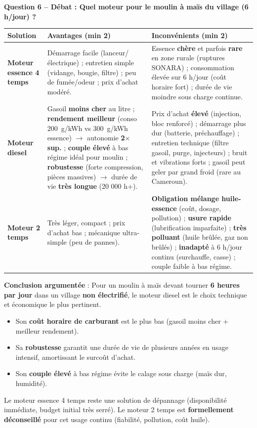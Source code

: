 \documentclass[11pt]{article}
\newcommand{\cle}[1]{{\popxbold\color{popdark}#1}}
\begin{document}
\begin{exoresolu}
\textbf{Question 6 -- Débat : Quel moteur pour le moulin à maïs du village (6 h/jour) ?}
\begin{center}
\begin{tabularx}{\linewidth}{|l|X|X|}
\hline
\rowcolor{popblueL} \textbf{Solution} & \textbf{Avantages (min 2)} & \textbf{Inconvénients (min 2)} \\
\hline
\textbf{Moteur essence 4 temps} & Démarrage facile (lanceur/électrique) ; entretien simple (vidange, bougie, filtre) ; peu de fumée/odeur ; prix d'achat modéré. & Essence \textbf{chère} et parfois \textbf{rare} en zone rurale (ruptures SONARA) ; consommation élevée sur 6 h/jour (coût horaire fort) ; durée de vie moindre sous charge continue.
\\ \hline
\textbf{Moteur diesel} & Gasoil \textbf{moins cher} au litre ; \textbf{rendement meilleur} (conso \SI{200}{g/kWh} vs \SI{300}{g/kWh} essence) $\rightarrow$ autonomie \textbf{2$\times$ sup.} ; \textbf{couple élevé} à bas régime idéal pour moulin ; \textbf{robustesse} (forte compression, pièces massives) $\rightarrow$ durée de vie \textbf{très longue} (20 000 h+). & Prix d'achat \textbf{élevé} (injection, bloc renforcé) ; démarrage plus dur (batterie, préchauffage) ; entretien technique (filtre gasoil, purge, injecteurs) ; bruit et vibrations forts ; gasoil peut geler par grand froid (rare au Cameroun).
\\ \hline
\textbf{Moteur 2 temps} & Très léger, compact ; prix d'achat bas ; mécanique ultra-simple (peu de pannes). & \textbf{Obligation mélange huile-essence} (coût, dosage, pollution) ; \textbf{usure rapide} (lubrification imparfaite) ; \textbf{très polluant} (huile brûlée, gaz non brûlés) ; \textbf{inadapté} à 6 h/jour continu (surchauffe, casse) ; couple faible à bas régime.
\\ \hline
\end{tabularx}
\end{center}

\textbf{Conclusion argumentée} : Pour un moulin à maïs devant tourner \textbf{6 heures par jour} dans un village \textbf{non électrifié}, le \cle{moteur diesel} est le choix technique et économique le plus pertinent. 
\begin{itemize}
\item Son \textbf{coût horaire de carburant} est le plus bas (gasoil moins cher + meilleur rendement).
\item Sa \textbf{robustesse} garantit une durée de vie de plusieurs années en usage intensif, amortissant le surcoût d'achat.
\item Son \textbf{couple élevé} à bas régime évite le calage sous charge (maïs dur, humidité).
\end{itemize}
Le moteur essence 4 temps reste une solution de dépannage (disponibilité immédiate, budget initial très serré). Le moteur 2 temps est \textbf{formellement déconseillé} pour cet usage continu (fiabilité, pollution, coût huile).
\end{exoresolu}
\end{document}
